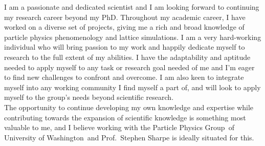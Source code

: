 \documentclass[11pt, a4paper]{awesome-cv}
\newcommand\research{Particle Physics Group}
\newcommand\uni{University of Washington}
\begin{document}
\begin{cvletter}
I am a passionate and dedicated scientist and I am looking forward to continuing my research career beyond my PhD.
Throughout my academic career, I have worked on a diverse set of projects, giving me a rich and broad knowledge of particle physics phenomenology and lattice simulations.
I am a very hard-working individual who will bring passion to my work and happily dedicate myself to research to the full extent of my abilities. 
I have the adaptability and aptitude needed to apply myself to any task or research goal needed of me and I'm eager to find new challenges to confront and overcome.
I am also keen to integrate myself into any working community I find myself a part of, and will look to apply myself to the group's needs beyond scientific research. 
\\
The opportunity to continue developing my own knowledge and expertise while contributing towards the expansion of scientific knowledge is something most valuable to me, and I believe working with the \research~of \uni~and Prof.~Stephen Sharpe is ideally situated for this. 

\end{cvletter}

\makeletterclosing
\end{document}
